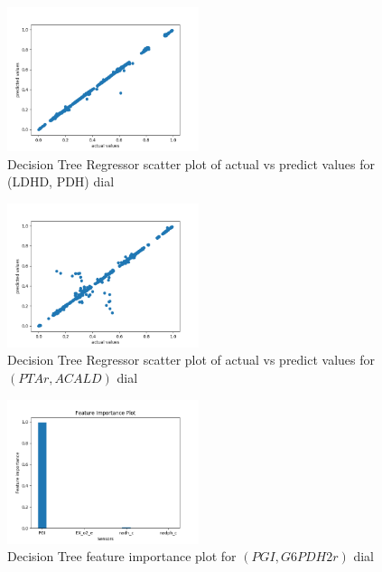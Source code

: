 \documentclass[12pt,chapterheads]{ucsd}
\begin{document}
\begin{figure}[h] 
\centering
\includegraphics[width=0.5\textwidth]{LDH_D_PDH_dtr}
\caption[Decision Tree Regressor scatter plot of actual vs predict values for \string(LDH\textunderscore D, PDH) dial]
{Decision Tree Regressor scatter plot of actual vs predict values for \string(LDH\textunderscore D, PDH) dial}
\label{fig:LdhPdhDtr}
\end{figure}

\begin{figure}[h] 
\centering
\includegraphics[width=0.5\textwidth]{PTAr_ACALD_dtr}
\caption[Decision Tree Regressor scatter plot of actual vs predict values for $(PTAr, ACALD)$ dial]
{Decision Tree Regressor scatter plot of actual vs predict values for $(PTAr, ACALD)$ dial}
\label{fig:PtarAcaldDtr}
\end{figure}

\begin{figure}[h] 
\centering
\includegraphics[width=0.5\textwidth]{PGI_G6PDH2r_dtr_important_features}
\caption[Decision Tree feature importance plot for $(PGI, G6PDH2r)$ dial]
{Decision Tree feature importance plot for $(PGI, G6PDH2r)$ dial}
\label{fig:PgiG6pdh2rDtrImp}
\end{figure}
\end{document}
